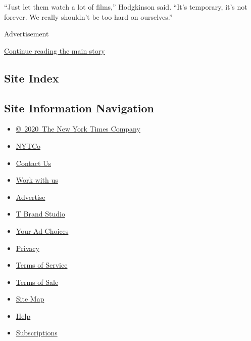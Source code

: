 ``Just let them watch a lot of films,'' Hodgkinson said. ``It's
temporary, it's not forever. We really shouldn't be too hard on
ourselves.''

Advertisement

\protect\hyperlink{after-bottom}{Continue reading the main story}

\hypertarget{site-index}{%
\subsection{Site Index}\label{site-index}}

\hypertarget{site-information-navigation}{%
\subsection{Site Information
Navigation}\label{site-information-navigation}}

\begin{itemize}
\tightlist
\item
  \href{https://help.nytimes3xbfgragh.onion/hc/en-us/articles/115014792127-Copyright-notice}{©~2020~The
  New York Times Company}
\end{itemize}

\begin{itemize}
\tightlist
\item
  \href{https://www.nytco.com/}{NYTCo}
\item
  \href{https://help.nytimes3xbfgragh.onion/hc/en-us/articles/115015385887-Contact-Us}{Contact
  Us}
\item
  \href{https://www.nytco.com/careers/}{Work with us}
\item
  \href{https://nytmediakit.com/}{Advertise}
\item
  \href{http://www.tbrandstudio.com/}{T Brand Studio}
\item
  \href{https://www.nytimes3xbfgragh.onion/privacy/cookie-policy\#how-do-i-manage-trackers}{Your
  Ad Choices}
\item
  \href{https://www.nytimes3xbfgragh.onion/privacy}{Privacy}
\item
  \href{https://help.nytimes3xbfgragh.onion/hc/en-us/articles/115014893428-Terms-of-service}{Terms
  of Service}
\item
  \href{https://help.nytimes3xbfgragh.onion/hc/en-us/articles/115014893968-Terms-of-sale}{Terms
  of Sale}
\item
  \href{https://spiderbites.nytimes3xbfgragh.onion}{Site Map}
\item
  \href{https://help.nytimes3xbfgragh.onion/hc/en-us}{Help}
\item
  \href{https://www.nytimes3xbfgragh.onion/subscription?campaignId=37WXW}{Subscriptions}
\end{itemize}
